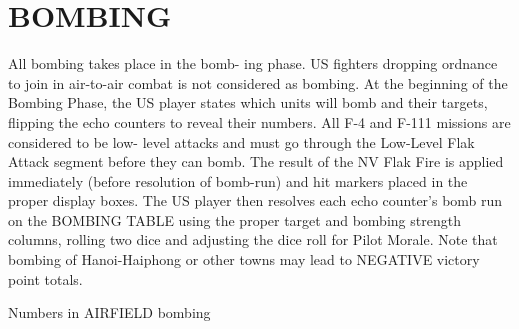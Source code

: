 \section*{BOMBING}
All bombing takes place in the bomb-
ing phase. US fighters dropping
ordnance to join in air-to-air combat is
not considered as bombing.
At the beginning of the Bombing
Phase, the US player states which
units will bomb and their targets,
flipping the echo counters to reveal
their numbers. All F-4 and F-111
missions are considered to be low-
level attacks and must go through the
Low-Level Flak Attack segment before
they can bomb. The result of the NV
Flak Fire is applied immediately
(before resolution of bomb-run) and
hit markers placed in the proper
display boxes.
The US player then resolves each
echo counter’s bomb run on the
BOMBING TABLE using the proper
target and bombing strength columns,
rolling two dice and adjusting the
dice roll for Pilot Morale. Note that
bombing of Hanoi-Haiphong or other
towns may lead to NEGATIVE
victory point totals.

Numbers in AIRFIELD bombing

\newpage


